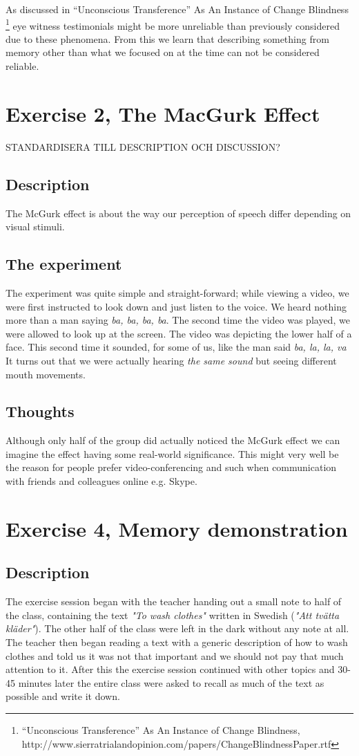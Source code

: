 \documentclass[10pt, a4paper]{article}
\begin{document}
As discussed in “Unconscious Transference” As An Instance of Change Blindness \footnote{“Unconscious Transference” As An Instance of Change Blindness, http://www.sierratrialandopinion.com/papers/ChangeBlindnessPaper.rtf} eye witness testimonials might be more unreliable than previously considered due to these phenomena. From this we learn that describing something from memory other than what we focused on at the time can not be considered reliable. 

\section{Exercise 2, The MacGurk Effect}
STANDARDISERA TILL DESCRIPTION OCH DISCUSSION?
\subsection{Description}
The McGurk effect is about the way our perception of speech differ depending on visual stimuli.

\subsection{The experiment}
The experiment was quite simple and straight-forward; while viewing a video, we were first instructed to look down and just listen to the voice. We heard nothing more than a man saying \emph{ba, ba, ba, ba}. The second time the video was played, we were allowed to look up at the screen. The video was depicting the lower half of a face.  This second time it sounded, for some of us, like the man said \emph{ba, la, la, va} It turns out that we were actually hearing \emph{the same sound} but seeing different mouth movements.

\subsection{Thoughts}
Although only half of the group did actually noticed the McGurk effect we can imagine the effect having some real-world significance. This might very well be the reason for people prefer video-conferencing and such when communication with friends and colleagues online e.g. Skype.

\section{Exercise 4, Memory demonstration}
\subsection{Description}
The exercise session began with the teacher handing out a small note to half of the class, containing the text \emph{"To wash clothes"} written in Swedish (\emph{"Att tvätta kläder"}). The other half of the class were left in the dark without any note at all. The teacher then began reading a text with a generic description of how to wash clothes and told us it was not that important and we should not pay that much attention to it. After this the exercise session continued with other topics and 30-45 minutes later the entire class were asked to recall as much of the text as possible and write it down.
\end{document}
